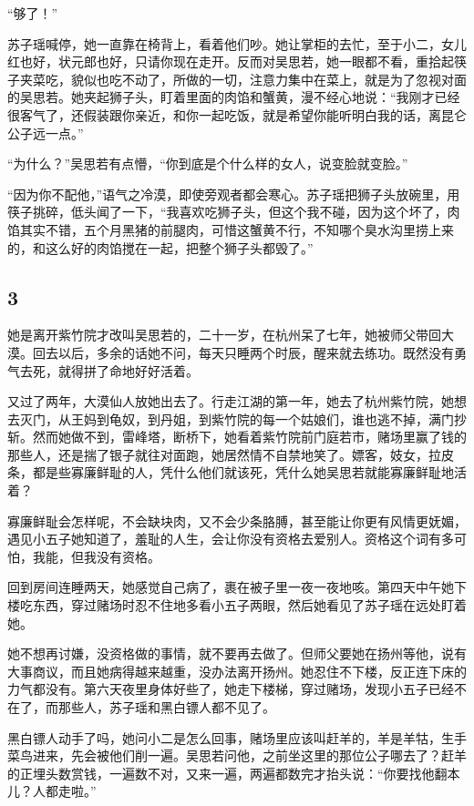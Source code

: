 “够了！”

苏子瑶喊停，她一直靠在椅背上，看着他们吵。她让掌柜的去忙，至于小二，女儿红也好，状元郎也好，只请你现在走开。反而对吴思若，她一眼都不看，重拾起筷子夹菜吃，貌似也吃不动了，所做的一切，注意力集中在菜上，就是为了忽视对面的吴思若。她夹起狮子头，盯着里面的肉馅和蟹黄，漫不经心地说：“我刚才已经很客气了，还假装跟你亲近，和你一起吃饭，就是希望你能听明白我的话，离昆仑公子远一点。”

“为什么？”吴思若有点懵，“你到底是个什么样的女人，说变脸就变脸。”

“因为你不配他，”语气之冷漠，即使旁观者都会寒心。苏子瑶把狮子头放碗里，用筷子挑碎，低头闻了一下，“我喜欢吃狮子头，但这个我不碰，因为这个坏了，肉馅其实不错，五个月黑猪的前腿肉，可惜这蟹黄不行，不知哪个臭水沟里捞上来的，和这么好的肉馅搅在一起，把整个狮子头都毁了。”
\newline

{\centering\subsection{3}}

她是离开紫竹院才改叫吴思若的，二十一岁，在杭州呆了七年，她被师父带回大漠。回去以后，多余的话她不问，每天只睡两个时辰，醒来就去练功。既然没有勇气去死，就得拼了命地好好活着。

又过了两年，大漠仙人放她出去了。行走江湖的第一年，她去了杭州紫竹院，她想去灭门，从王妈到龟奴，到丹姐，到紫竹院的每一个姑娘们，谁也逃不掉，满门抄斩。然而她做不到，雷峰塔，断桥下，她看着紫竹院前门庭若市，赌场里赢了钱的那些人，还是揣了银子就往对面跑，她居然情不自禁地笑了。嫖客，妓女，拉皮条，都是些寡廉鲜耻的人，凭什么他们就该死，凭什么她吴思若就能寡廉鲜耻地活着？

寡廉鲜耻会怎样呢，不会缺块肉，又不会少条胳膊，甚至能让你更有风情更妩媚，遇见小五子她知道了，羞耻的人生，会让你没有资格去爱别人。资格这个词有多可怕，我能，但我没有资格。

回到房间连睡两天，她感觉自己病了，裹在被子里一夜一夜地咳。第四天中午她下楼吃东西，穿过赌场时忍不住地多看小五子两眼，然后她看见了苏子瑶在远处盯着她。

她不想再讨嫌，没资格做的事情，就不要再去做了。但师父要她在扬州等他，说有大事商议，而且她病得越来越重，没办法离开扬州。她忍住不下楼，反正连下床的力气都没有。第六天夜里身体好些了，她走下楼梯，穿过赌场，发现小五子已经不在了，而那些人，苏子瑶和黑白镖人都不见了。

黑白镖人动手了吗，她问小二是怎么回事，赌场里应该叫赶羊的，羊是羊牯，生手菜鸟进来，先会被他们削一遍。吴思若问他，之前坐这里的那位公子哪去了？赶羊的正埋头数赏钱，一遍数不对，又来一遍，两遍都数完才抬头说：“你要找他翻本儿？人都走啦。”

